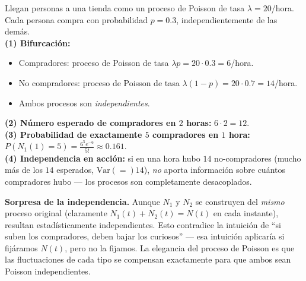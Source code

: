 \documentclass[10pt,a4paper]{article}
\numberwithin{equation}{section}
\newcommand{\Var}[1]{\mathrm{Var}\!\left(#1\right)}
\newcounter{excount}[section]
\renewcommand{\theexcount}{\thesection.\arabic{excount}}
\newenvironment{ejemplo}[1]{%
  \refstepcounter{excount}%
  \begin{tcolorbox}[exbox, title={Ejemplo \theexcount\ \textperiodcentered\ #1}]%
}{\end{tcolorbox}}
\newenvironment{cuidado}{\begin{tcolorbox}[warnbox]}{\end{tcolorbox}}
\begin{document}
\begin{ejemplo}{Tienda con compradores y curiosos}
  Llegan personas a una tienda como un proceso de Poisson de tasa $\lambda = 20$/hora.
  Cada persona compra con probabilidad $p = 0.3$, independientemente de las dem\'as.
  \\[3pt]
  \textbf{(1) Bifurcaci\'on:}
  \begin{itemize}
    \item Compradores: proceso de Poisson de tasa $\lambda p = 20 \cdot 0.3 = 6$/hora.
    \item No compradores: proceso de Poisson de tasa $\lambda(1-p) = 20 \cdot 0.7 = 14$/hora.
    \item Ambos procesos son \emph{independientes}.
  \end{itemize}
  \textbf{(2) N\'umero esperado de compradores en $2$ horas:} $6 \cdot 2 = 12$.
  \\
  \textbf{(3) Probabilidad de exactamente $5$ compradores en $1$ hora:}
  $P(N_1(1) = 5) = \frac{6^5 e^{-6}}{5!} \approx 0.161$.
  \\
  \textbf{(4) Independencia en acci\'on:} si en una hora hubo $14$ no-compradores (mucho m\'as
  de los $14$ esperados, $\Var = 14$), \emph{no} aporta informaci\'on sobre cu\'antos
  compradores hubo --- los procesos son completamente desacoplados.
\end{ejemplo}

\begin{cuidado}
  \textbf{Sorpresa de la independencia.} Aunque $N_1$ y $N_2$ se construyen del \emph{mismo}
  proceso original (claramente $N_1(t) + N_2(t) = N(t)$ en cada instante), resultan
  estad\'isticamente independientes. Esto contradice la intuici\'on de ``si suben los
  compradores, deben bajar los curiosos'' --- esa intuici\'on aplicar\'ia si fij\'aramos $N(t)$,
  pero no la fijamos. La elegancia del proceso de Poisson es que las fluctuaciones de cada
  tipo se compensan exactamente para que ambos sean Poisson independientes.
\end{cuidado}

\begin{center}
\end{center}
\end{document}
